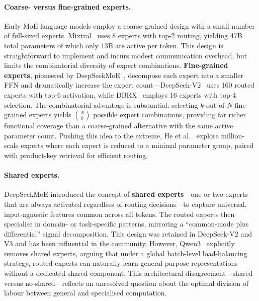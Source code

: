 \paragraph{Coarse- versus fine-grained experts.}
Early MoE language models employ a coarse-grained design with a small number of full-sized experts.
Mixtral~\cite{jiang2024mixtral} uses 8 experts with top-2 routing, yielding 47B total parameters of which only 13B are active per token.
This design is straightforward to implement and incurs modest communication overhead, but limits the combinatorial diversity of expert combinations.
\textbf{Fine-grained experts}, pioneered by DeepSeekMoE~\cite{dai2024deepseekmoe}, decompose each expert into a smaller FFN and dramatically increase the expert count---DeepSeek-V2~\cite{deepseekv2_2024} uses 160 routed experts with top-6 activation, while DBRX~\cite{databricks2024dbrx} employs 16 experts with top-4 selection.
The combinatorial advantage is substantial: selecting $k$ out of $N$ fine-grained experts yields $\binom{N}{k}$ possible expert combinations, providing far richer functional coverage than a coarse-grained alternative with the same active parameter count.
Pushing this idea to the extreme, He et al.~\cite{he2024million} explore million-scale experts where each expert is reduced to a minimal parameter group, paired with product-key retrieval for efficient routing.

\paragraph{Shared experts.}
DeepSeekMoE introduced the concept of \textbf{shared experts}---one or two experts that are always activated regardless of routing decisions---to capture universal, input-agnostic features common across all tokens.
The routed experts then specialise in domain- or task-specific patterns, mirroring a ``common-mode plus differential'' signal decomposition.
This design was retained in DeepSeek-V2 and V3 and has been influential in the community.
However, Qwen3~\cite{qwen2025qwen3} explicitly removes shared experts, arguing that under a global batch-level load-balancing strategy, routed experts can naturally learn general-purpose representations without a dedicated shared component.
This architectural disagreement---shared versus no-shared---reflects an unresolved question about the optimal division of labour between general and specialised computation.

